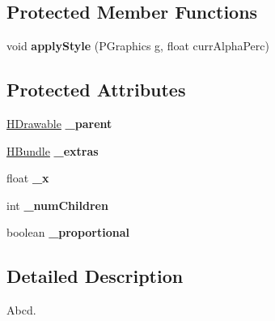 \subsection*{Protected Member Functions}
\begin{DoxyCompactItemize}
\item 
\hypertarget{classhype_1_1drawable_1_1_h_drawable_a1888aed57c719a397222b9e82ed08a4e}{void {\bfseries apply\-Style} (P\-Graphics g, float curr\-Alpha\-Perc)}\label{classhype_1_1drawable_1_1_h_drawable_a1888aed57c719a397222b9e82ed08a4e}

\end{DoxyCompactItemize}
\subsection*{Protected Attributes}
\begin{DoxyCompactItemize}
\item 
\hypertarget{classhype_1_1drawable_1_1_h_drawable_a1f95d00444c6964efa4239ddf135a10e}{\hyperlink{classhype_1_1drawable_1_1_h_drawable}{H\-Drawable} {\bfseries \-\_\-parent}}\label{classhype_1_1drawable_1_1_h_drawable_a1f95d00444c6964efa4239ddf135a10e}

\item 
\hypertarget{classhype_1_1drawable_1_1_h_drawable_a77a64d01b7766ad4d0e338f82ab23f12}{\hyperlink{classhype_1_1util_1_1_h_bundle}{H\-Bundle} {\bfseries \-\_\-extras}}\label{classhype_1_1drawable_1_1_h_drawable_a77a64d01b7766ad4d0e338f82ab23f12}

\item 
\hypertarget{classhype_1_1drawable_1_1_h_drawable_a20c0ae16de46b74c903667ac2db1640a}{float {\bfseries \-\_\-x}}\label{classhype_1_1drawable_1_1_h_drawable_a20c0ae16de46b74c903667ac2db1640a}

\item 
\hypertarget{classhype_1_1drawable_1_1_h_drawable_a1e2205f639598af5f419b82ae5bdc0cf}{int {\bfseries \-\_\-num\-Children}}\label{classhype_1_1drawable_1_1_h_drawable_a1e2205f639598af5f419b82ae5bdc0cf}

\item 
\hypertarget{classhype_1_1drawable_1_1_h_drawable_a7f9bb1ed841a8c8fe52e351ee3bf5844}{boolean {\bfseries \-\_\-proportional}}\label{classhype_1_1drawable_1_1_h_drawable_a7f9bb1ed841a8c8fe52e351ee3bf5844}

\end{DoxyCompactItemize}


\subsection{Detailed Description}
Abcd. 

